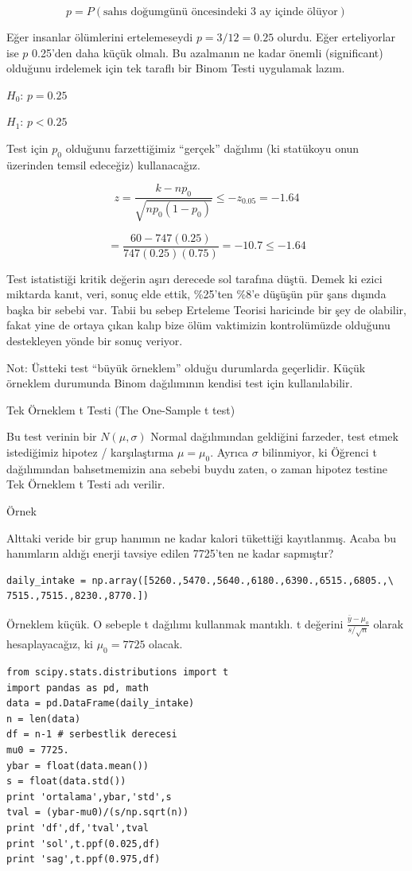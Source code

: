 \documentclass[12pt,fleqn]{article}\usepackage{../../common}
\begin{document}
$$ p = P(\textrm{sahıs doğumgünü öncesindeki 3 ay içinde ölüyor}) $$

Eğer insanlar ölümlerini ertelemeseydi $p = 3/12 = 0.25$ olurdu. Eğer
erteliyorlar ise $p$ 0.25'den daha küçük olmalı. Bu azalmanın ne kadar
önemli (significant) olduğunu irdelemek için tek taraflı bir Binom Testi
uygulamak lazım. 

$H_0$: $p = 0.25$

$H_1$: $p < 0.25$

Test için $p_0$ olduğunu farzettiğimiz ``gerçek'' dağılımı (ki statükoyu
onun üzerinden temsil edeceğiz) kullanacağız. 

$$ z = \frac{k-np_0}{\sqrt{np_0(1-p_0)}} \le -z_{0.05} = -1.64 $$

$$ = \frac{60-747(0.25)}{747(0.25)(0.75)} = -10.7 \le -1.64  $$

Test istatistiği kritik değerin aşırı derecede sol tarafına düştü. Demek ki
ezici miktarda kanıt, veri, sonuç elde ettik, \%25'ten \%8'e düşüşün pür
şans dışında başka bir sebebi var. Tabii bu sebep Erteleme Teorisi
haricinde bir şey de olabilir, fakat yine de ortaya çıkan kalıp bize ölüm
vaktimizin kontrolümüzde olduğunu destekleyen yönde bir sonuç veriyor.

Not: Üstteki test ``büyük örneklem'' olduğu durumlarda geçerlidir. Küçük
örneklem durumunda Binom dağılımının kendisi test için kullanılabilir.

Tek Örneklem t Testi (The One-Sample t test)

Bu test verinin bir $N(\mu,\sigma)$ Normal dağılımından geldiğini farzeder,
test etmek istediğimiz hipotez / karşılaştırma $\mu = \mu_0$. Ayrıca
$\sigma$ bilinmiyor, ki Öğrenci t dağılımından bahsetmemizin ana sebebi
buydu zaten, o zaman hipotez testine Tek Örneklem t Testi adı verilir.

Örnek

Alttaki veride bir grup hanımın ne kadar kalori tükettiği
kayıtlanmış. Acaba bu hanımların aldığı enerji tavsiye edilen 7725'ten ne
kadar sapmıştır?

\begin{verbatim}
daily_intake = np.array([5260.,5470.,5640.,6180.,6390.,6515.,6805.,\
7515.,7515.,8230.,8770.])
\end{verbatim}

Örneklem küçük. O sebeple t dağılımı kullanmak mantıklı. t değerini
$\frac{\bar{y}-\mu_o}{s/\sqrt{n}}$ olarak hesaplayacağız, ki $\mu_0=7725$
olacak.

\begin{verbatim}
from scipy.stats.distributions import t
import pandas as pd, math
data = pd.DataFrame(daily_intake)
n = len(data)
df = n-1 # serbestlik derecesi
mu0 = 7725.
ybar = float(data.mean())
s = float(data.std())
print 'ortalama',ybar,'std',s
tval = (ybar-mu0)/(s/np.sqrt(n))
print 'df',df,'tval',tval
print 'sol',t.ppf(0.025,df)
print 'sag',t.ppf(0.975,df)
\end{verbatim}
\end{document}
